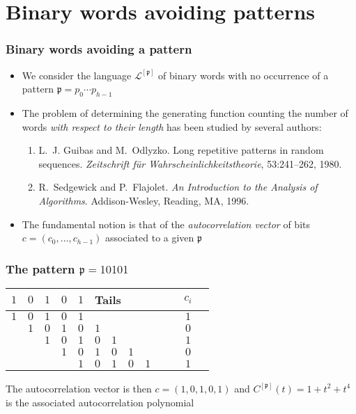 \documentclass{beamer}
\begin{document}
\section{Binary words avoiding patterns}

\begin{frame} \frametitle{Binary words avoiding a pattern}
\begin{itemize}
\item We consider the language $\mathcal{L}^{[\mathfrak{p}]}$ of binary words
with no occurrence of a pattern  $\mathfrak{p}=p_0\cdots p_{h-1}$
\item  The problem of determining the generating function  counting
the number of words \emph{with respect to their length} has been studied
by several authors:

\begin{enumerate}
\item L.~J. Guibas and M.~Odlyzko.
 Long repetitive patterns in random sequences.
{\em Zeitschrift f\"{u}r Wahrscheinlichkeitstheorie}, 53:241--262,
  1980.
\item R.~Sedgewick and P.~Flajolet.
 {\em An {I}ntroduction to the {A}nalysis of {A}lgorithms}.
Addison-Wesley, Reading, MA, 1996.
\end{enumerate}
\item The fundamental notion is that of the \emph{autocorrelation vector} of
bits $c=(c_0,\ldots ,c_{h-1})$ associated to a given $\mathfrak{p}$
\end{itemize}
\end{frame}

\begin{frame} \frametitle{The pattern $\mathfrak{p}=10101$}
\begin{center}
\begin{tabular}{ccccc|cccccccc}
  $1$ & $0$ & $1$ & $0$ & $1$ & \multicolumn{6}{l}{Tails} & $c_{i}$  \\
  \hline
  $1$ & $0$ & $1$ & $0$ & $1$ & &   &   &   &   &   &    $1$ \\
    & $1$ & $0$ & $1$ & $0$ & $1$ &  &   &   &   &   &    $0$ \\
    &   & $1$ & $0$ & $1$ & $0$ & $1$ & &   &   &   &    $1$ \\
    &   &   & $1$ & $0$ & $1$ & $0$ & $1$ &  &   &   &    $0$ \\
    &   &   &   & $1$ & $0$ & $1$ & $0$ & $1$ &  &   &    $1$\\
\end{tabular}
\end{center}
The autocorrelation vector is then $c=(1,0,1,0,1)$ and  
$C^{[\mathfrak{p}]}(t)=1+t^{2}+t^{4}$ is the associated
autocorrelation polynomial
\end{frame}
\end{document}
